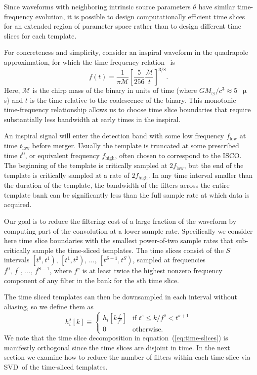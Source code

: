 \documentclass[preprint2]{aastex}
\newcommand{\ISCO}{ISCO}%
\newcommand{\SVD}{SVD}%
\begin{document}
Since waveforms with neighboring intrinsic source parameters $\theta$
 have similar time-frequency evolution, it is possible to design computationally
efficient time slices for an extended region of parameter space rather than to
design different time slices for each template.

For concreteness and simplicity, consider an inspiral waveform in the
quadrapole approximation, for which the time-frequency relation~\citep{kidder1992, findchirppaper} is
%
\begin{equation} \label{eq:fgw}
%
f(t) = \frac{1}{\pi \mathcal{M}} \left[ \frac{5}{256}\frac{\mathcal{M}}{t}
\right]^{3/8}.
%
\end{equation}
%
Here, $\mathcal{M}$ is the chirp mass of the binary in units of time (where $G
M_\odot / c^3 \approx 5$~$\upmu$s) and $t$ is the time relative to the
coalescence of the binary.
This monotonic time-frequency relationship allows us
to choose time slice boundaries that require substantially less bandwidth at
early times in the inspiral.

An inspiral signal will enter the detection band with some low frequency
$f_\mathrm{low}$ at time $t_\mathrm{low}$ before merger.  Usually the template
is truncated at some prescribed time $t^0$, or equivalent frequency $f_\mathrm{high}$,
often chosen to correspond to the \ISCO. The beginning of the template is critically
sampled at $2 f_\mathrm{low}$, but the end of the template is critically sampled at a
rate of $2 f_\mathrm{high}$. In any time interval smaller than the duration of the template,
the bandwidth of the filters across the entire template bank can be significantly less
than the full sample rate at which data is acquired.

Our goal is to reduce the filtering cost of a
large fraction of the waveform by computing part of the convolution at a lower
sample rate.  Specifically we consider here time slice boundaries with the
smallest power-of-two sample rates that sub-critically sample the time-sliced
templates.  The time slices consist of the $S$ intervals
$\left[t^0, t^1\right),\, \left[t^1, t^2\right),\, \dots,\, \left[t^{S-1}, t^S\right)$,
sampled at frequencies $f^0,\, f^1,\, \dots,\, f^\mathrm{S-1}$, where $f^s$ is at
least twice the highest nonzero frequency component of any filter in the bank for the
$s$th time slice.

The time sliced templates can then be downsampled in each interval without
aliasing, so we define them as
%
\begin{equation}
\label{eq:time-sliced-templates}
h_{i}^{s}[k] \equiv
	\begin{cases}
		h_{i}\!\left[k\frac{f}{f^s}\right] & \textrm{if } t^s \leqslant k/f^s < t^{s+1} \\
		0 & \textrm{otherwise.}
	\end{cases}
\end{equation}
%
We note that the time slice decomposition in equation~(\ref{eq:time-slices}) is
manifestly orthogonal since the time slices are disjoint in time.  In the next
section we examine how to reduce the number of filters within each time slice
via \SVD\ of the time-sliced templates.
\end{document}
